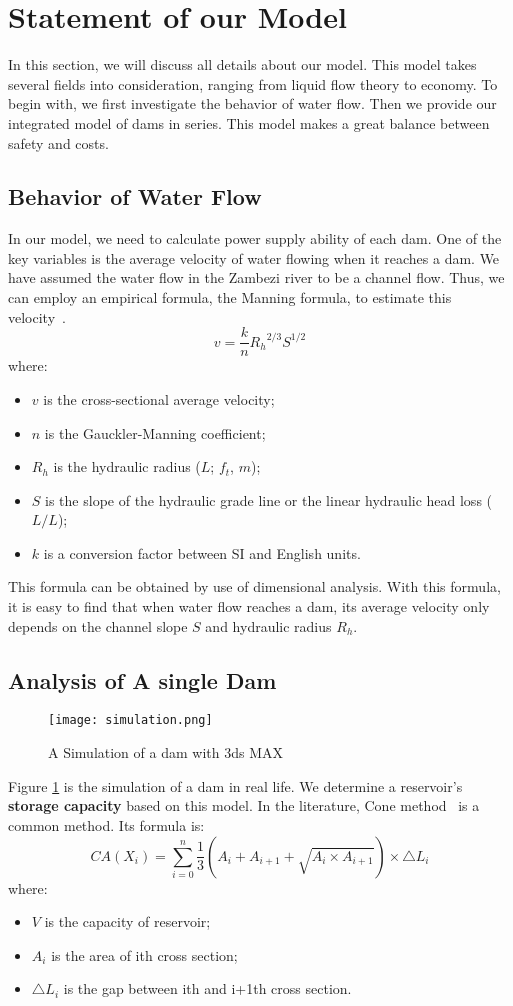\documentclass{mcmthesis}
\begin{document}
\section{Statement of our Model} \label{Sec-Model}
In this section, we will discuss all details about our model. This model takes several fields into consideration, ranging from liquid flow theory to economy. To begin with, we first investigate the behavior of water flow. Then we provide our integrated model of dams in series. This model makes a great balance between safety and costs.
\subsection{Behavior of Water Flow}%
In our model, we need to calculate power supply ability of each dam. One of the key variables is the average velocity of water flowing when it reaches a dam. We have assumed the water flow in the Zambezi river to be a channel flow. Thus, we can employ an empirical formula, the Manning formula, to estimate this velocity~\cite{Wiki_Manning}.
\begin{equation}
\label{eq:Manning}
v=\frac{k}{n} {R_h}^{2/3} S^{1/2}
\end{equation}
where:
\begin{itemize}
\item $v$ is the cross-sectional average velocity;
\item $n$ is the Gauckler-Manning coefficient;
\item $R_h$ is the hydraulic radius ($L$; $f_t$, $m$);
\item $S$ is the slope of the hydraulic grade line or the linear hydraulic head loss ($L/L$);
\item $k$ is a conversion factor between SI and English units.
\end{itemize}

This formula can be obtained by use of dimensional analysis. With this formula, it is easy to find that when water flow reaches a dam, its average velocity only depends on the channel slope $S$ and hydraulic radius $R_h$.
\subsection{Analysis of A single Dam}\label{Sec:single}
\begin{figure}[h]
    \centering
    \texttt{[image: simulation.png]}
    \caption{A Simulation of a dam with 3ds MAX}
    \label{fig:3ds}
\end{figure}
Figure \ref{fig:3ds} is the simulation of a dam in real life. We determine a reservoir's \textbf{storage capacity} based on this model. In the literature, Cone method~\cite{Edu_Reservoir} is a common method. Its formula is:
$$CA(X_i) = \sum_{i=0}^n\frac{1}{3}(A_i+A_{i+1}+\sqrt{A_i \times A_{i+1}})\times \bigtriangleup L_i$$
where:
\begin{itemize}
\item $V$ is the capacity of reservoir;
\item $A_i$ is the area of ith cross section;
\item  $\bigtriangleup L_i$ is the gap between ith and i+1th cross section.
\end{itemize}
\end{document}
